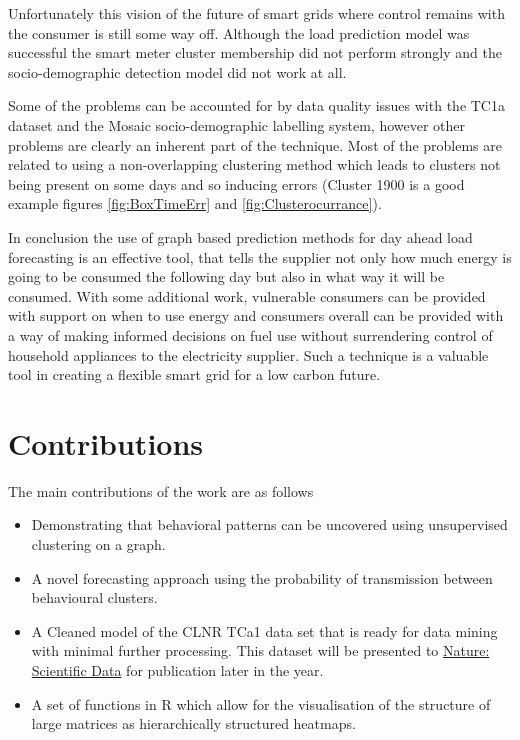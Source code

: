 Unfortunately this vision of the future of smart grids where control remains with the consumer is still some way off. Although the load prediction model was successful the smart meter cluster membership did not perform strongly and the socio-demographic detection model did not work at all. 

Some of the problems can be accounted for by data quality issues with the TC1a dataset and the Mosaic socio-demographic labelling system, however other problems are clearly an inherent part of the technique. Most of the problems are related to using a non-overlapping clustering method which leads to clusters not being present on some days and so inducing errors (Cluster 1900 is a good example figures \ref{fig:BoxTimeErr} and \ref{fig:Clusterocurrance}).

In conclusion the use of graph based prediction methods for day ahead load forecasting is an effective tool, that tells the supplier not only how much energy is going to be consumed the following day but also in what way it will be consumed. With some additional work, vulnerable consumers can be provided with support on when to use energy and consumers overall can be provided with a way of making informed decisions on fuel use without surrendering control of household appliances to the electricity supplier. Such a technique is a valuable tool in creating a flexible smart grid for a low carbon future.


\section{Contributions}
The main contributions of the work are as follows
\begin{itemize}
\itemsep0em 
    \item Demonstrating that behavioral patterns can be uncovered using unsupervised clustering on a graph.
    \item A novel forecasting approach using the probability of transmission between behavioural clusters.
    \item A Cleaned model of the CLNR TCa1 data set that is ready for data mining with minimal further processing. This dataset will be presented to \href{http://www.nature.com/sdata/about}{Nature: Scientific Data} for publication later in the year.
    \item A set of functions in R which allow for the visualisation of the structure of large matrices as hierarchically structured heatmaps.
\end{itemize}


